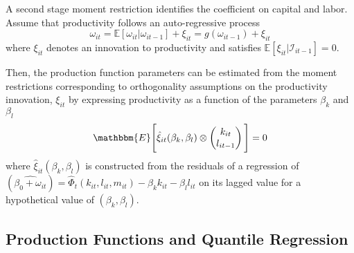 \documentclass[11pt]{article}
\begin{document}
A second stage moment restriction identifies the coefficient on capital and labor. Assume that productivity follows an auto-regressive process
\begin{equation}
\omega_{it}=\mathbb{E}[\omega_{it}|\omega_{it-1}]+\xi_{it}=g(\omega_{it-1})+\xi_{it}
\end{equation}
where $\xi_{it}$ denotes an innovation to productivity and satisfies $\mathbb{E}[\xi_{it}|\mathcal{I}_{it-1}]=0$.

Then, the production function parameters can be estimated from the moment restrictions corresponding to orthogonality assumptions on the productivity innovation, $\xi_{it}$ by expressing productivity as a function of the parameters $\beta_{k}$ and $\beta_{l}$
\begin{equation}
\mathbbm{E}\Bigg[\hat{\xi}_{it}(\beta_{k}, \beta_{l})\otimes
\begin{pmatrix}
k_{it}\\
l_{it-1}
\end{pmatrix}\Bigg]=0
\end{equation}
where $\hat{\xi}_{it}(\beta_{k}, \beta_{l})$ is constructed from the residuals of a regression of $(\widehat{\beta_{0}+\omega_{it}})=\hat{\Phi}_{t}(k_{it}, l_{it}, m_{it})-\beta_{k}k_{it}-\beta_{l}l_{it}$ on its lagged value for a hypothetical value of $(\beta_{k}, \beta_{l})$.  

\subsection{Production Functions and Quantile Regression}
\end{document}
